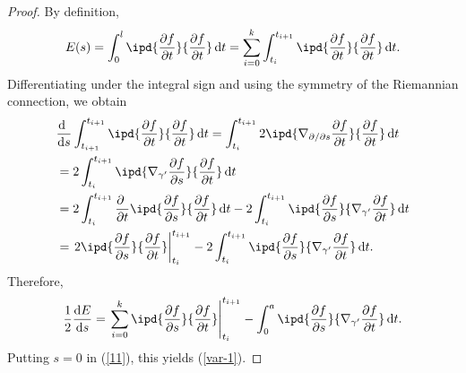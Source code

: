 \begin{proof}
  By definition,
  \[
    E(s)=\int_0^{l}\ipd{\frac{\partial f}{\partial t} }{\frac{\partial f}{\partial t} }\,\mathrm{d}t=\sum_{i=0}^{k} \int_{t_i}^{t_{i+1}}\ipd{\frac{\partial f}{\partial t} }{\frac{\partial f}{\partial t} }\,\mathrm{d}t.
  \] 
  Differentiating under the integral sign and using the symmetry of the Riemannian connection, we obtain
  \begin{align*}
    & \frac{\mathrm{d}~}{\mathrm{d}s}\int_{t_{i+1}}^{t_{i+1}}\ipd{\frac{\partial f}{\partial t} }{\frac{\partial f}{\partial t} }\,\mathrm{d}t=\int_{t_{i}}^{t_{i+1}}2\ipd{\nabla _{\partial/\partial s} \frac{\partial f}{\partial t} }{\frac{\partial f}{\partial t} }\,\mathrm{d}t\\
    &= 2\int_{t_{i}}^{t_{i+1}}\ipd{\nabla _{\gamma'} \frac{\partial f}{\partial s} }{\frac{\partial f}{\partial t} }\,\mathrm{d}t \\
    &=2\int_{t_{i}}^{t_{i+1}}\frac{\partial~}{\partial t}\ipd{\frac{\partial f}{\partial s} }{\frac{\partial f}{\partial t} }\,\mathrm{d}t-2\int_{t_{i}}^{t_{i+1}}\ipd{\frac{\partial f}{\partial s} }{\nabla _{\gamma'} \frac{\partial f}{\partial t} }\,\mathrm{d}t\\
    &=\left.2\ipd{\frac{\partial f}{\partial s} }{\frac{\partial f}{\partial t} }\right|_{t_{i}}^{t_{i+1}}-2\int_{t_{i}}^{t_{i+1}}\ipd{\frac{\partial f}{\partial s} }{\nabla _{\gamma'} \frac{\partial f}{\partial t}}\,\mathrm{d}t
  .\end{align*}
  Therefore,
  \begin{equation}
    \frac{1}{2} \frac{\mathrm{d}E}{\mathrm{d}s}=\left.\sum_{i=0}^{k} \ipd{\frac{\partial f}{\partial s} }{\frac{\partial f}{\partial t} }\right|_{t_i}^{t_{i+1}}-\int_0^{a}\ipd{\frac{\partial f}{\partial s} }{\nabla _{\gamma'}\frac{\partial f}{\partial t} }\,\mathrm{d}t.\label{11}
  \end{equation}
  Putting $s=0$ in (\ref{11}), this yields (\ref{var-1}).
\end{proof}

